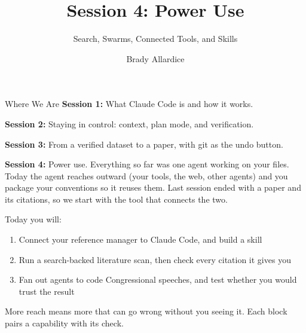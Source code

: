 \documentclass[aspectratio=169, 11pt]{beamer}
\title{Session 4: Power Use}
\subtitle{Search, Swarms, Connected Tools, and Skills}
\author{Brady Allardice}
\date{}
\institute{UPF \& IBEI}
\begin{document}
\begin{frame}[plain]
  \titlepage
\end{frame}


\begin{frame}{Where We Are}
  \textbf{Session 1:} What Claude Code is and how it works.

  \vspace{0.4em}
  \textbf{Session 2:} Staying in control: context, plan mode, and verification.

  \vspace{0.4em}
  \textbf{Session 3:} From a verified dataset to a paper, with git as the undo button.

  \vspace{0.4em}
  \textbf{Session 4:} Power use. Everything so far was one agent working on your files. Today the agent reaches outward (your tools, the web, other agents) and you package your conventions so it reuses them. Last session ended with a paper and its citations, so we start with the tool that connects the two.

  \vspace{0.6em}
  Today you will:
  \begin{enumerate}
    \item Connect your reference manager to Claude Code, and build a skill
    \item Run a search-backed literature scan, then check every citation it gives you
    \item Fan out agents to code Congressional speeches, and test whether you would trust the result
  \end{enumerate}

  \vspace{0.4em}
  \alert{More reach means more that can go wrong without you seeing it. Each block pairs a capability with its check.}
\end{frame}
\end{document}
